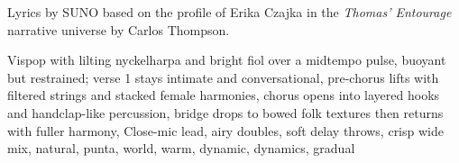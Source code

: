 
\begin{notes}
Lyrics by SUNO based on the profile of Erika Czajka in the \emph{Thomas’ Entourage} narrative universe by Carlos Thompson.
\end{notes}
\begin{style}
Vispop with lilting nyckelharpa and bright fiol over a midtempo pulse, buoyant but restrained; verse 1 stays intimate and conversational, pre-chorus lifts with filtered strings and stacked female harmonies, chorus opens into layered hooks and handclap-like percussion, bridge drops to bowed folk textures then returns with fuller harmony, Close-mic lead, airy doubles, soft delay throws, crisp wide mix, natural, punta, world, warm, dynamic, dynamics, gradual
\end{style}
